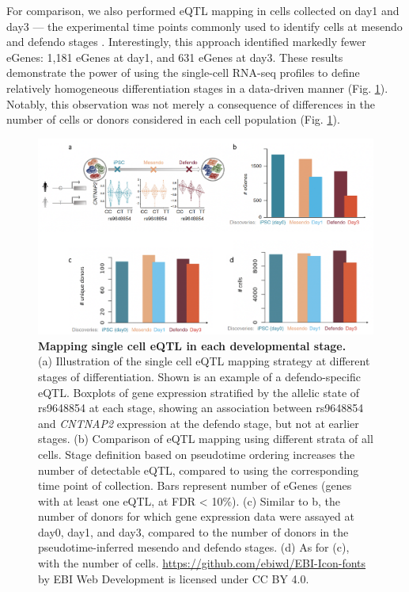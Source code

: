 For comparison, we also performed eQTL mapping in cells collected on day1 and day3 — the experimental time points commonly used to identify cells at mesendo and defendo stages \cite{hannan2013production}.
Interestingly, this approach identified markedly fewer eGenes: 1,181 eGenes at day1, and 631 eGenes at day3.
These results demonstrate the power of using the single-cell RNA-seq profiles to define relatively homogeneous differentiation stages in a data-driven manner (Fig. \ref{fig:endodiff_stage_eqtl}). 
Notably, this observation was not merely a consequence of differences in the number of cells or donors considered in each cell population (Fig. \ref{fig:endodiff_stage_eqtl}). \\

\begin{figure}[h]
\centering
\includegraphics[width=14cm]{Chapter4/Fig/endodiff_eqtl.png}
\caption[eQTL maps of iPSC, mesendo, defendo]{\textbf{Mapping single cell eQTL in each developmental stage.}\\
(a) Illustration of the single cell eQTL mapping strategy at different stages of differentiation.
Shown is an example of a defendo-specific eQTL. 
Boxplots of gene expression stratified by the allelic state of
rs9648854 at each stage, showing an association between rs9648854 and \textit{CNTNAP2} expression at the defendo stage, but not at earlier stages. 
(b) Comparison of eQTL mapping using different strata of all cells.
Stage definition based on pseudotime ordering increases the number of detectable eQTL, compared to using the corresponding time point of collection.
Bars represent number of eGenes (genes with at least one eQTL, at FDR < 10\%).
(c) Similar to b, the number of donors for which gene expression data were assayed at day0, day1, and day3, compared to the number of donors in the pseudotime-inferred mesendo and defendo stages.
(d) As for (c), with the number of cells.
\url{https://github.com/ebiwd/EBI-Icon-fonts} by EBI Web Development is licensed under CC BY 4.0. }
\label{fig:endodiff_stage_eqtl}
\end{figure}

